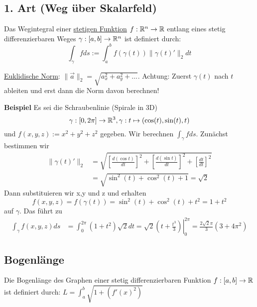 \subsection{1. Art (Weg über Skalarfeld)}
Das Wegintegral einer \underline{stetigen Funktion} $f: \mathbb{R}^n \to \mathbb{R}$ entlang
eines stetig differenzierbaren Weges $\gamma: [a,b] \to \mathbb{R}^n$ ist definiert durch:
\vspace{-0.3cm}\[
\int_\gamma f ds := \int_a^b f(\gamma(t)) \|\gamma(t)'\|_2 dt
\]

\underline{Euklidische Norm}: $\|\vec{a}\|_2 = \sqrt{a_x^2 + a_y^2 + \ldots}$.
Achtung: Zuerst $\gamma(t)$ nach $t$ ableiten und erst dann die Norm davon berechnen!

\textbf{Beispiel}
Es sei die Schraubenlinie (Spirale in 3D)
\[
\gamma : [0,2\pi]  \to \mathbb{R}^3, \gamma : t \mapsto  (\cos(t), \sin(t), t) 
\]
und $f(x,y,z) := x^2 + y^2 + z^2$ gegeben. Wir berechnen $\int_\gamma f ds$. Zunächst bestimmen wir
\begin{align*}
\|\gamma(t)'\|_2 &= \sqrt{\left[\frac{d(\cos t)}{dt}\right]^2 +
\left[\frac{d(\sin t)}{dt}\right]^2 + \left[\frac{dt}{dt}\right]^2} \\
&= \sqrt{\sin^2(t)+\cos^2(t)+1}=\sqrt{2}
\end{align*}
Dann substituieren wir x,y und z und erhalten
\[
f(x,y,z) = f(\gamma(t)) = \sin^2(t)+\cos^2(t)+t^2 = 1 +t^2
\]
auf $\gamma$. Das führt zu
{\vspace{-0.2cm}\small
\begin{align*}
\int_\gamma f(x,y,z) ds &= \int_0^{2\pi} (1 +t^2)\sqrt{2} dt = \left. \sqrt{2}(t+\frac{t^3}{3}) \right|_0^{2\pi} 
= \frac{2\sqrt{2}\pi}{3}(3+4\pi^2)
\end{align*}}
\vspace{-0.4cm}
\subsection{Bogenlänge}
\begin{definition} Die Bogenlänge des Graphen einer stetig differenzierbaren Funktion $f: [a, b] \to \mathbb{R}$ ist definiert durch:
$L = \int_a^b \sqrt{1 + (f'(x)^2)}$
\end{definition}


\pagebreak